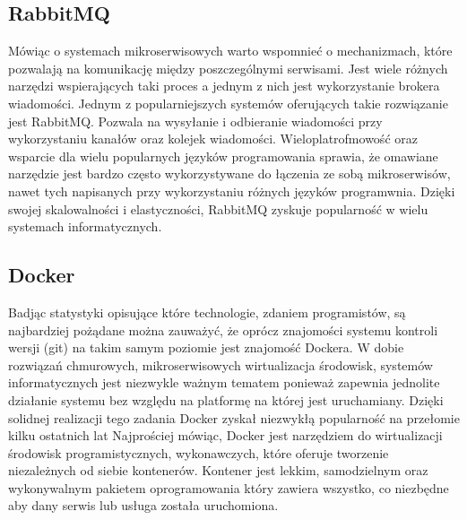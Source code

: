 \subsection{RabbitMQ}
Mówiąc o systemach mikroserwisowych warto wspomnieć o mechanizmach, które pozwalają na komunikację między poszczególnymi serwisami. Jest wiele różnych narzędzi wspierających taki proces a jednym z nich jest wykorzystanie brokera wiadomości.
Jednym z popularniejszych systemów oferujących takie rozwiązanie jest RabbitMQ. Pozwala na wysyłanie i odbieranie wiadomości przy wykorzystaniu kanałów oraz kolejek wiadomości. Wieloplatrofmowość oraz wsparcie dla wielu popularnych języków programowania sprawia, że omawiane narzędzie jest bardzo często wykorzystywane do łączenia ze sobą mikroserwisów, nawet tych napisanych przy wykorzystaniu różnych języków programwnia. Dzięki swojej skalowalności i elastyczności, RabbitMQ zyskuje popularność w wielu systemach informatycznych.


\subsection{Docker}
Badjąc statystyki opisujące które technologie, zdaniem programistów, są najbardziej pożądane można zauważyć, że oprócz znajomości systemu kontroli wersji (git) na takim samym poziomie jest znajomość Dockera. W dobie rozwiązań chmurowych, mikroserwisowych wirtualizacja środowisk, systemów informatycznych jest niezwykle ważnym tematem ponieważ zapewnia jednolite działanie systemu bez względu na platformę na której jest uruchamiany. Dzięki solidnej realizacji tego zadania Docker zyskał niezwykłą popularność na przełomie kilku ostatnich lat 
Najprościej mówiąc, Docker jest narzędziem do wirtualizacji środowisk programistycznych, wykonawczych, które oferuje tworzenie niezależnych od siebie kontenerów. Kontener jest lekkim, samodzielnym oraz wykonywalnym pakietem oprogramowania który zawiera wszystko, co niezbędne aby dany serwis lub usługa została uruchomiona.
